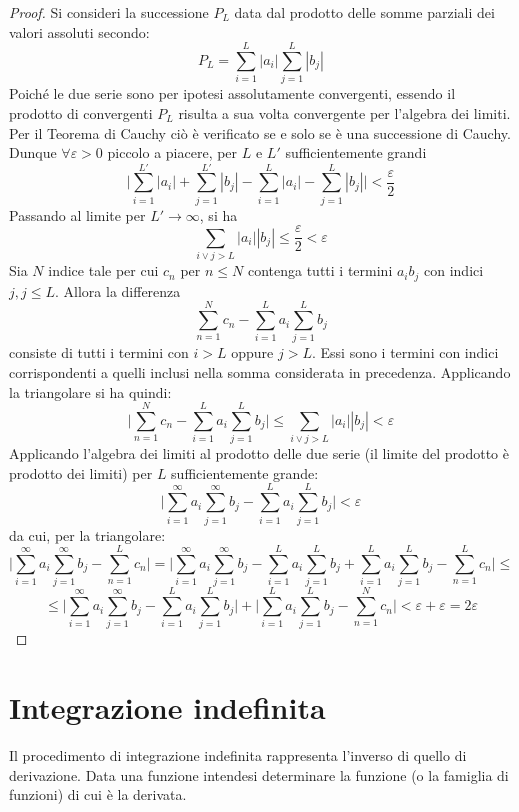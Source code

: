 \documentclass[10pt, oneside]{book}
\theoremstyle{plain}
\begin{document}
\begin{proof}
    Si consideri la successione $P_L$ data dal prodotto delle somme parziali dei valori assoluti secondo:
    \[P_L = \sum \limits_{i=1}^L |a_i| \sum \limits_{j=1}^L |b_j|\]
    Poiché le due serie sono per ipotesi assolutamente convergenti, essendo il prodotto di convergenti $P_L$ risulta a sua volta convergente per l'algebra dei limiti. Per il Teorema di Cauchy ciò è verificato se e solo se è una successione di Cauchy. Dunque $\forall \varepsilon > 0$ piccolo a piacere, per $L$ e $L'$ sufficientemente grandi
    \[\big|\sum \limits_{i=1}^{L'} |a_i| + \sum \limits_{j=1}^{L'} |b_j| - \sum \limits_{i=1}^{L} |a_i| - \sum \limits_{j=1}^{L} |b_j|\big| < \frac{\varepsilon}{2}\]
    Passando al limite per $L' \rightarrow \infty$, si ha 
    \[\sum_{i \lor j > L} |a_i||b_j| \leq \frac{\varepsilon}{2} < \varepsilon\]
    Sia $N$ indice tale per cui $c_n$ per $n \leq N$ contenga tutti i termini $a_i b_j$ con indici $j, j \leq L$. Allora la differenza
    \[\sum \limits_{n=1}^{N} c_n - \sum \limits_{i=1}^{L} a_i \sum \limits_{j=1}^{L} b_j\]
    consiste di tutti i termini con $i > L$ oppure $j > L$. Essi sono i termini con indici corrispondenti a quelli inclusi nella somma considerata in precedenza. Applicando la triangolare si ha quindi:
    \[\bigg|\sum \limits_{n=1}^{N} c_n - \sum \limits_{i=1}^{L} a_i \sum \limits_{j=1}^{L} b_j \bigg| \leq \sum_{i \lor j > L} |a_i||b_j| < \varepsilon\]
    Applicando l'algebra dei limiti al prodotto delle due serie (il limite del prodotto è prodotto dei limiti) per $L$ sufficientemente grande:
    \[\bigg| \sum \limits_{i=1}^{\infty} a_i \sum \limits_{j=1}^{\infty} b_j - \sum \limits_{i=1}^{L} a_i \sum \limits_{j=1}^{L} b_j\bigg| < \varepsilon\]
    da cui, per la triangolare: 
    \[\bigg|\sum \limits_{i=1}^{\infty} a_i \sum \limits_{j=1}^{\infty} b_j - \sum \limits_{n=1}^{L} c_n \bigg| = \bigg|\sum \limits_{i=1}^{\infty} a_i \sum \limits_{j=1}^{\infty} b_j - \sum \limits_{i=1}^{L} a_i \sum \limits_{j=1}^{L} b_j + \sum \limits_{i=1}^{L} a_i \sum \limits_{j=1}^{L} b_j - \sum \limits_{n=1}^{L} c_n \bigg| \leq\]
    \[\leq \bigg| \sum \limits_{i=1}^{\infty} a_i \sum \limits_{j=1}^{\infty} b_j - \sum \limits_{i=1}^{L} a_i \sum \limits_{j=1}^{L} b_j\bigg| + \bigg|\sum \limits_{i=1}^{L} a_i \sum \limits_{j=1}^{L} b_j - \sum \limits_{n=1}^{N} c_n\bigg| < \varepsilon + \varepsilon = 2 \varepsilon\]
\end{proof}

\chapter{Integrazione indefinita}
Il procedimento di integrazione indefinita rappresenta l'inverso di quello di derivazione. Data una funzione intendesi determinare la funzione (o la famiglia di funzioni) di cui è la derivata.
\end{document}
